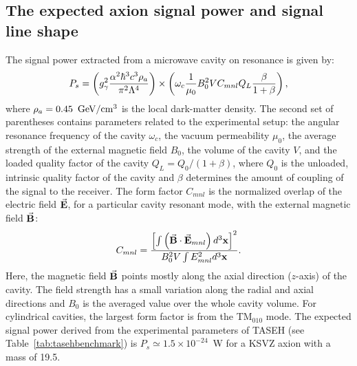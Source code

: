\subsection{The expected axion signal power and signal line shape}
\label{sec:introsignal}

The signal power extracted from a microwave cavity on resonance is given 
by:
\begin{equation}
P_s = \left(g_{\gamma}^2\frac{\alpha^2\hbar^3c^3\rho_a}{\pi^2\Lambda^4}\right)\times
\left(\omega_c\frac{1}{\mu_0}B_0^2VC_{mnl}Q_L\frac{\beta}{1+\beta}\right),
\label{eq:ps}
\end{equation}
where $\rho_a=0.45~\,\text{Ge\hspace{-.08em}V}/\mathrm{cm}^3$ is the local dark-matter density. 
The second set of parentheses contains parameters related to the experimental 
setup: the angular resonance frequency of the cavity $\omega_c$, 
the vacuum permeability $\mu_0$, the average strength of the external magnetic 
field $B_0$, the volume of the cavity $V$, and the loaded quality factor of the 
cavity 
\(Q_L=Q_0/(1+\beta)\), where $Q_0$ is the unloaded, intrinsic quality factor 
of the cavity and $\beta$ determines the amount of coupling of the signal to 
the receiver. The form factor $C_{mnl}$ is the normalized 
overlap of the electric field 
$\vec{\bold{E}}$, for a particular cavity resonant mode, with the external magnetic 
field $\vec{\bold{B}}$:
\begin{equation}
  C_{mnl} = \frac{\left[\int\left( \vec{\bold{B}}\cdot\vec{\bold{E}}_{mnl}\right) d^3\bold{x}\right]^2}{B_0^2V\int E_{mnl}^2 d^3\bold{x}}.
\label{eq:formfactor} 
\end{equation} 
Here, the magnetic field $\vec{\bold{B}}$ points mostly along the axial 
direction ($z$-axis) of the cavity. 
The field strength has a small variation along the radial and axial directions and 
$B_0$ is the averaged value over the whole cavity volume. 
For cylindrical cavities, the largest form factor is from the 
TM$_{010}$ mode. The expected signal power derived from the experimental 
parameters of TASEH (see Table~\ref{tab:tasehbenchmark}) 
is $P_s\simeq 1.5\times10^{-24}$~W for a KSVZ axion with a 
mass of 19.5\muevcc. 

